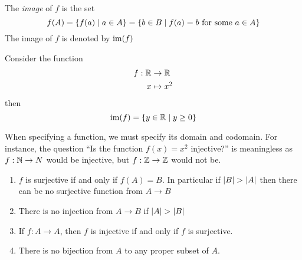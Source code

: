 \documentclass{article}
\begin{document}
\begin{defi}[Image]
    The \emph{image} of $f$ is the set
    \[
        f(A) = \left\{ f(a) \mid a \in A \right\} = \left\{ b \in B \mid f(a) = b \text{ for some } a \in A \right\}  
    \]
    The image of $f$ is denoted by $\operatorname{im}(f)$
\end{defi}
\begin{eg}
    Consider the function
    \begin{align*}
        f: \mathbb{R} &\rightarrow \mathbb{R} \\
        x &\mapsto x^2
    \end{align*}
    then 
    \[
        \operatorname{im}(f) = \left\{ y \in \mathbb{R} \mid y \geq 0 \right\}  
    \]
\end{eg}
\begin{warning}
    When specifying a function, we must specify its domain and codomain. 
    For instance, the question ``Is the function $f(x) = x^2$ injective?'' is meaningless as
    $f: \mathbb{N} \rightarrow N$ would be injective, but $f: \mathbb{Z} \rightarrow \mathbb{Z}$ would not be.
\end{warning}
\begin{remark}\leavevmode
    \begin{enumerate}[label=(\arabic*)]
        \item $f$ is surjective if and only if $f(A) = B$. 
        In particular if $\left\lvert B\right\rvert > \left\lvert A\right\rvert$ then there can be no surjective function from $A \rightarrow B$

        \item There is no injection from $A \rightarrow B$ if $\left\lvert A\right\rvert > \left\lvert B\right\rvert$
        \item If $f: A \rightarrow A$, then $f$ is injective if and only if $f$ is surjective.
        \item There is no bijection from $A$ to any proper subset of $A$.
    \end{enumerate}
\end{remark}
\end{document}
